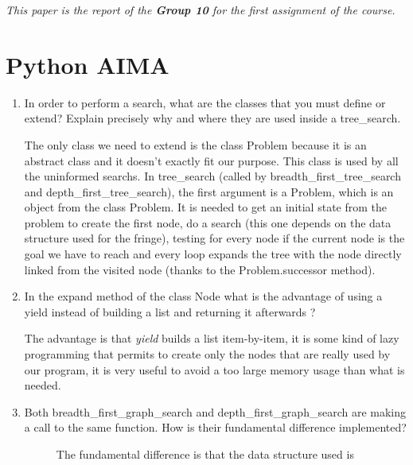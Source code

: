 \bigskip
\textit{This paper is the report of the \textbf{Group 10} for the first assignment
of the course.}

\section{Python AIMA}

\begin{enumerate}
    \item In order to perform a search, what are the classes that you
        must define or extend? Explain precisely why and where they are
        used inside a tree\_search.
        \begin{framed}
            The only class we need to extend is the class Problem because
            it is an abstract class and it doesn't exactly fit our purpose.
            This class is used by all the uninformed searchs. In
            tree\_search (called by breadth\_first\_tree\_search and
            depth\_first\_tree\_search), the first argument is a Problem,
            which is an object from the class Problem. It is needed to get
            an initial state from the problem to create the first node, do a search (this one
            depends on the data structure used for the fringe), testing
            for every node if the current node is the goal we have to
            reach and every loop expands the tree with the node directly
            linked from the visited node (thanks to the Problem.successor
            method).
        \end{framed}
    \item In the expand method of the class Node what is the advantage
        of using a yield instead of building a list and returning it
        afterwards ?
        \begin{framed}
            The advantage is that \textit{yield} builds a list item-by-item, it is
            some kind of lazy programming that permits to create only the
            nodes that are really used by our program, it is very useful to
            avoid a too large memory usage than what is needed.
        \end{framed}
    \item Both breadth\_first\_graph\_search and depth\_first\_graph\_search
        are making a call to the same function. How is their fundamental
        difference implemented?
        \begin{figure}[!ht]
        \begin{framed}
            The fundamental difference is that the data structure used is

\end{framed}
\end{figure}
\end{enumerate}
